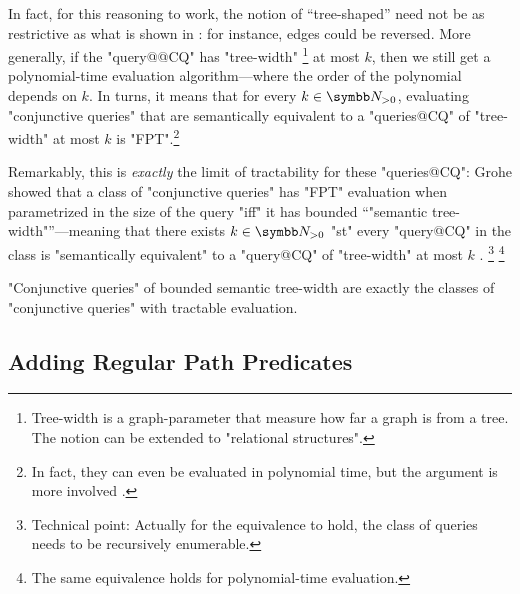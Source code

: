In fact, for this reasoning to work, the notion of ``tree-shaped'' need not
be as restrictive as what is shown in : for instance,
edges could be reversed. More generally, if the "query@@CQ" has "tree-width"%
\footnote{Tree-width is a graph-parameter that measure how far a graph is from a tree.
The notion can be extended to "relational structures".}
at most $k$, then we still get a polynomial-time evaluation algorithm---where the order
of the polynomial depends on $k$. In turns, it means that for every $k\in\Np$,
evaluating "conjunctive queries" that are semantically equivalent to
a "queries@CQ" of "tree-width" at most $k$ is "FPT".\footnote{In fact,
they can even be evaluated in polynomial time, but the argument is more involved
\cite{ChekuriRajaraman2000Containment}.}

Remarkably, this is \emph{exactly} the limit of tractability for these "queries@CQ":
Grohe showed that a class of "conjunctive queries" has "FPT" evaluation when parametrized in the 
size of the query "iff"
it has bounded ``"semantic tree-width"''---meaning that there exists $k\in\Np$ "st"
every "query@CQ" in the class is "semantically equivalent" to a "query@CQ" 
of "tree-width" at most $k$ \cite{Grohe2007ComplexityHomomorphism}.%
\footnote{Technical point: Actually for the equivalence to hold, the class of queries
needs to be recursively enumerable.}%
\footnote{The same equivalence holds for polynomial-time evaluation.}

\begin{known}
	"Conjunctive queries" of bounded semantic tree-width are exactly
	the classes of "conjunctive queries" with tractable evaluation.
\end{known}


\subsection{Adding Regular Path Predicates}

